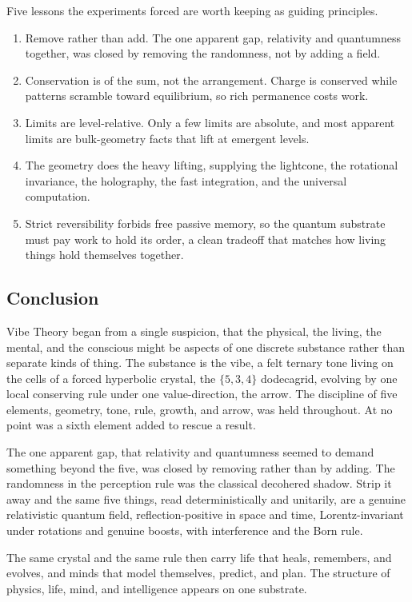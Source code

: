 Five lessons the experiments forced are worth keeping as guiding principles.

\begin{enumerate}
\item Remove rather than add.
The one apparent gap, relativity and quantumness together, was closed by removing the randomness, not by
adding a field.
\item Conservation is of the sum, not the arrangement. Charge is conserved while patterns
scramble toward equilibrium, so rich permanence costs work.
\item Limits are level-relative. Only a few
limits are absolute, and most apparent limits are bulk-geometry facts that lift at emergent levels.
\item The geometry does the heavy lifting, supplying the lightcone, the rotational invariance, the holography, the
fast integration, and the universal computation.
\item Strict reversibility forbids free passive memory, so
the quantum substrate must pay work to hold its order, a clean tradeoff that matches how living things hold
themselves together.
\end{enumerate}

\subsection{Conclusion}

Vibe Theory began from a single suspicion, that the physical, the living, the mental, and the conscious might
be aspects of one discrete substance rather than separate kinds of thing. The substance is the vibe, a felt
ternary tone living on the cells of a forced hyperbolic crystal, the $\{5,3,4\}$ dodecagrid, evolving by one
local conserving rule under one value-direction, the arrow. The discipline of five elements, geometry, tone,
rule, growth, and arrow, was held throughout. At no point was a sixth element added to rescue a result.

The one apparent gap, that relativity and quantumness seemed to demand something beyond the five, was closed
by removing rather than by adding. The randomness in the perception rule was the classical decohered shadow.
Strip it away and the same five things, read deterministically and unitarily, are a genuine relativistic
quantum field, reflection-positive in space and time, Lorentz-invariant under rotations and genuine boosts,
with interference and the Born rule.

The same crystal and the same rule then carry life that heals,
remembers, and evolves, and minds that model themselves, predict, and plan. The structure of physics, life,
mind, and intelligence appears on one substrate.

